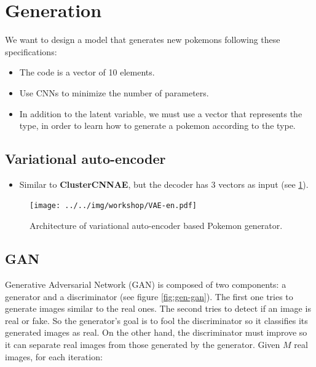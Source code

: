 \documentclass[11pt, a4paper]{article}
\begin{document}
\section{Generation}

We want to design a model that generates new pokemons following these specifications: 
\begin{itemize}
	\item The code is a vector of 10 elements.
	\item Use CNNs to minimize the number of parameters.
	\item In addition to the latent variable, we must use a vector that represents the type, in order to learn how to generate a pokemon according to the type.
\end{itemize}

\subsection{Variational auto-encoder}

\begin{itemize}
	\item Similar to \textbf{ClusterCNNAE}, but the decoder has 3 vectors as input (see \ref{fig:gen-vae}).
\end{itemize}

\begin{figure}[htp]
	\centering
	\texttt{[image: ../../img/workshop/VAE-en.pdf]}
	\caption{Architecture of variational auto-encoder based Pokemon generator.}
	\label{fig:gen-vae}
\end{figure}

\subsection{GAN}

Generative Adversarial Network (GAN) is composed of two components: a generator and a discriminator (see figure \ref{fig:gen-gan}). 
The first one tries to generate images similar to the real ones.
The second tries to detect if an image is real or fake. 
So the generator's goal is to fool the discriminator so it classifies its generated images as real. 
On the other hand, the discriminator must improve so it can separate real images from those generated by the generator.
Given $ M $ real images, for each iteration:
\end{document}
